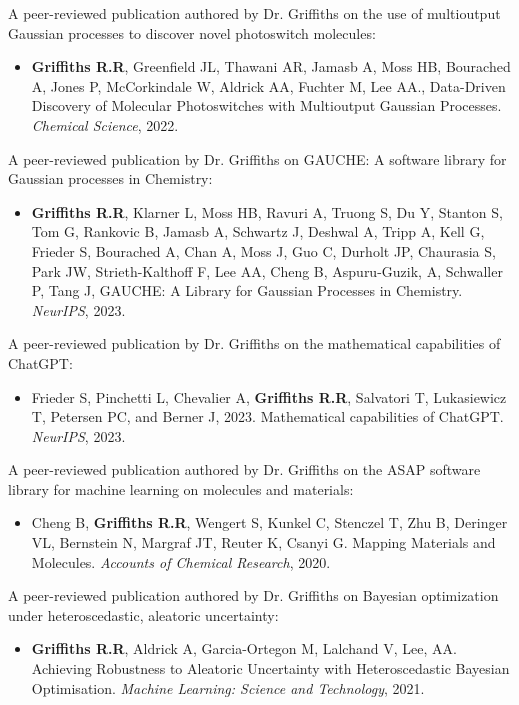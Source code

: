 \documentclass[11pt]{article}
\begin{document}
\begin{thebibliography}{9}
A peer-reviewed publication authored by Dr. Griffiths on the use of multioutput Gaussian processes to discover novel photoswitch molecules:
\begin{itemize}
\item \textbf{Griffiths R.R}, Greenfield JL, Thawani AR, Jamasb A, Moss HB, Bourached A, Jones P, McCorkindale W, Aldrick AA, Fuchter M, Lee AA., Data-Driven Discovery of Molecular Photoswitches with Multioutput Gaussian Processes. \textit{Chemical Science}, 2022.
\end{itemize}

A peer-reviewed publication by Dr. Griffiths on GAUCHE: A software library for Gaussian processes in Chemistry:
\begin{itemize}
\item \textbf{Griffiths R.R}, Klarner L, Moss HB, Ravuri A, Truong S, Du Y, Stanton S, Tom G, Rankovic B, Jamasb A, Schwartz J, Deshwal A, Tripp A, Kell G, Frieder S, Bourached A, Chan A, Moss J, Guo C, Durholt JP, Chaurasia S, Park JW, Strieth-Kalthoff F, Lee AA, Cheng B, Aspuru-Guzik, A, Schwaller P, Tang J, GAUCHE: A Library for Gaussian Processes in Chemistry. \textit{NeurIPS}, 2023.
\end{itemize}

A peer-reviewed publication by Dr. Griffiths on the mathematical capabilities of ChatGPT:
\begin{itemize}
\item Frieder S, Pinchetti L, Chevalier A, \textbf{Griffiths R.R}, Salvatori T, Lukasiewicz T, Petersen PC, and Berner J, 2023. Mathematical capabilities of ChatGPT. \textit{NeurIPS}, 2023.
\end{itemize}

A peer-reviewed publication authored by Dr. Griffiths on the ASAP software library for machine learning on molecules and materials:
\begin{itemize}
\item Cheng B, \textbf{Griffiths R.R}, Wengert S, Kunkel C, Stenczel T, Zhu B, Deringer VL, Bernstein N, Margraf JT, Reuter K, Csanyi G. Mapping Materials and Molecules. \textit{Accounts of Chemical Research}, 2020. 
\end{itemize}

A peer-reviewed publication authored by Dr. Griffiths on Bayesian optimization under heteroscedastic, aleatoric uncertainty:
\begin{itemize}
\item \textbf{Griffiths R.R}, Aldrick A, Garcia-Ortegon M, Lalchand V, Lee, AA. Achieving Robustness to Aleatoric Uncertainty with Heteroscedastic Bayesian Optimisation. \textit{Machine Learning: Science and Technology}, 2021.
\end{itemize}


\end{thebibliography}
\end{document}
